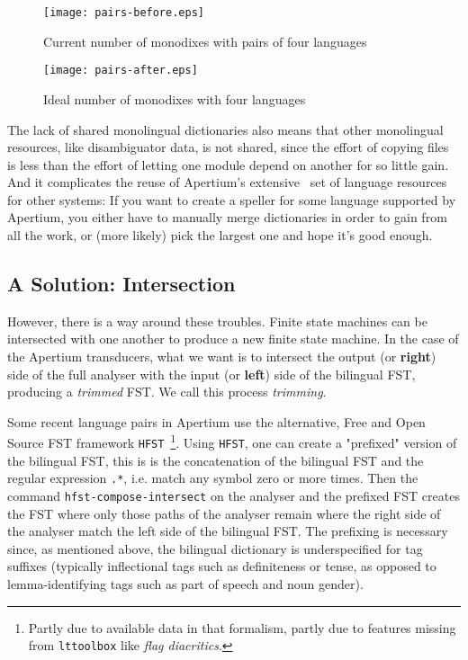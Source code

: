 \documentclass[10pt, a4paper]{article}
\newcommand{\ana}[1]{\texttt{#1}}
\newcommand{\tool}[1]{\texttt{#1}}
\begin{document}
\begin{figure}[h]
  \begin{center}
    \texttt{[image: pairs-before.eps]}
    \caption{Current number of monodixes with pairs of four languages}
    \label{fig:monodixes-current}
  \end{center}
\end{figure}

\begin{figure}[h]
  \begin{center}
    \texttt{[image: pairs-after.eps]}
    \caption{Ideal number of monodixes with four languages}
    \label{fig:monodixes-ideally}
  \end{center}
\end{figure}

The lack of shared monolingual dictionaries also means that other
monolingual resources, like disambiguator data, is not shared, since
the effort of copying files is less than the effort of letting one
module depend on another for so little gain. And it complicates the reuse
of Apertium's extensive~\cite{tyers2010fosresources} set of language
resources for other systems: If you want to create a speller for some
language supported by Apertium, you either have to manually merge
dictionaries in order to gain from all the work, or (more likely) pick
the largest one and hope it's good enough.

\subsection{A Solution: Intersection}
\label{sec:solution}

However, there is a way around these troubles. Finite state machines
can be intersected with one another to produce a new finite state
machine. In the case of the Apertium transducers, what we want is to
intersect the output (or \textbf{right}) side of the full analyser
with the input (or \textbf{left}) side of the bilingual FST, producing
a \emph{trimmed} FST. We call this process \emph{trimming}.

Some recent language pairs in Apertium use the alternative, Free and
Open Source FST framework \tool{HFST}~\cite{linden2011hfst}\footnote{Partly
due to available data in that formalism, partly due to features
missing from \tool{lttoolbox} like \emph{flag diacritics}.}. Using
\tool{HFST}, one can create a "prefixed" version of the bilingual FST, this
is is the concatenation of the bilingual FST and the regular
expression \ana{.*}, i.e. match any symbol zero or more times. Then
the command \tool{hfst-compose-intersect} on the analyser and the
prefixed FST creates the FST where only those paths of the analyser
remain where the right side of the analyser match the left side of the
bilingual FST. The prefixing is necessary since, as mentioned above,
the bilingual dictionary is underspecified for tag suffixes (typically
inflectional tags such as definiteness or tense, as opposed to
lemma-identifying tags such as part of speech and noun gender).
\end{document}
